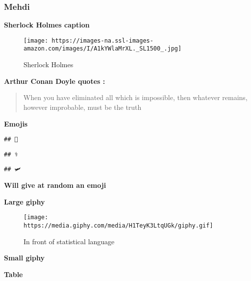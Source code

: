 \documentclass[]{article}
\begin{document}
\subsubsection{Mehdi}\label{mehdi}

\textbf{Sherlock Holmes caption}

\begin{figure}
\centering
\texttt{[image: https://images-na.ssl-images-amazon.com/images/I/A1kYWlaMrXL.\_SL1500\_.jpg]}
\caption{Sherlock Holmes}
\end{figure}

\textbf{Arthur Conan Doyle quotes :}

\begin{quote}
When you have eliminated all which is impossible, then whatever remains,
however improbable, must be the truth
\end{quote}

\textbf{Emojis}

\begin{verbatim}
## 🧟
\end{verbatim}

\begin{verbatim}
## ⚕️
\end{verbatim}

\begin{verbatim}
## 🛩
\end{verbatim}

\textbf{Will give at random an emoji}

\textbf{Large giphy}

\begin{figure}
\centering
\texttt{[image: https://media.giphy.com/media/H1TeyK3LtqUGk/giphy.gif]}
\caption{In front of statistical language}
\end{figure}

\textbf{Small giphy}

\textbf{Table}
\end{document}
